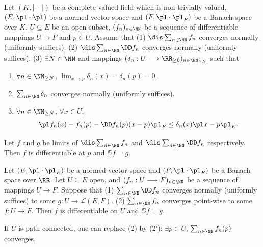\begin{propositionenv}\label{9.10.10}
    Let $(K,\left| \ \cdot\ \right|)$ be a complete valued field which is non-trivially valued, $(E,\pl\cdot\pl)$ be a normed vector space and $(F,\pl\cdot\pl_F)$ be a  Banach space over $K$. $U\subseteq E$ be an open subset, $(f_n)_{n\in\NN}$ be a sequence of differentiable mappings $U\longrightarrow F$ and $p\in U$. Assume that 
    \newline
    (1) $\dis \sum_{n\in\NN}f_n$ converges normally (uniformly suffices).
    \newline
    (2) $\dis \sum_{n\in\NN}\DD f_n$ converges normally (uniformly suffices).
    \newline
    (3) $\exists N\in \NN$ and mappings $(\delta_n: U\longrightarrow \RR_{\ge 0})_{n\in\NN_{\ge N}}$ such that
    \begin{enumerate}
        \item $\forall n\in \NN_{\ge N}$, $\lim_{x\rightarrow p}\delta_n(x)=\delta_n(p)=0$.
        \item $\sum_{n\in \NN}\delta_n$ converges normally (uniformly suffices).
        \item $\forall n\in \NN_{\ge N}$, $\forall x\in U$,
            $$ \pl f_n(x)-f_n(p)-\DD f_n(p)(x-p)\pl_F\le \delta_n(x)\pl x-p\pl_E.$$
    \end{enumerate}
    Let $f$ and $g$ be limits of $\dis \sum_{n\in\NN}f_n$ and $\dis \sum_{n\in \NN}\DD f_n$ respectively. Then $f$ is differentiable at $p$ and $\DD f=g$.
\end{propositionenv}
\begin{propositionenv}
    Let $(E,\pl\cdot\pl_E)$ be a normed vector space and $(F,\pl\cdot\pl_F)$ be a Banach space over $\RR$. Let $U\subseteq E$ open, and $(f_n:U\longrightarrow F)_{n\in\NN}$ be a sequence of mappings $U\longrightarrow F$. Suppose that
    \newline
    (1) $\sum_{n\in\NN} \DD f_n$ converges normally (uniformly suffices) to some $g:U\longrightarrow \mathscr{L}(E,F)$.
    \newline
    (2) $\sum_{n\in\NN}f_n$ converges point-wise to some $f:U\longrightarrow F$.
    \newline
    Then $f$ is differentiable on $U$ and $\DD f=g$.
\end{propositionenv}
\begin{remark}
    If $U$ is path connected, one can replace (2) by (2'): $\exists p\in U$, $\sum_{n\in\NN}f_n(p)$ converges.
\end{remark}

